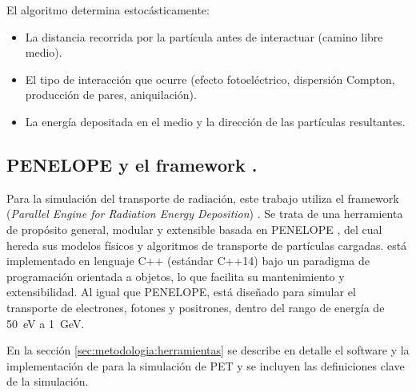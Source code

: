 
El algoritmo determina estocásticamente:
\begin{itemize}
      \item La distancia recorrida por la partícula antes de interactuar (camino libre medio).
      \item El tipo de interacción que ocurre (efecto fotoeléctrico, dispersión Compton, producción de pares, aniquilación).
      \item La energía depositada en el medio y la dirección de las partículas resultantes.
\end{itemize}


\subsection{PENELOPE y el framework \penred.}
\label{sec:estado_del_arte_fund_teoricos:penelope_penred}

Para la simulación del transporte de radiación, este trabajo utiliza el framework \penred (\emph{Parallel Engine for Radiation Energy Deposition}) \cite{Gimnez-Alventosa2021}. Se trata de una herramienta de propósito general, modular y extensible basada en PENELOPE \cite{Bar1995}, del cual hereda sus modelos físicos y algoritmos de transporte de partículas cargadas. \penred está implementado en lenguaje C++ (estándar C++14) bajo un paradigma de programación orientada a objetos, lo que facilita su mantenimiento y extensibilidad. Al igual que PENELOPE, \penred está diseñado para simular el transporte de electrones, fotones y positrones, dentro del rango de energía de \SI{50}{\electronvolt} a \SI{1}{\giga\electronvolt}.

En la sección \ref{sec:metodologia:herramientas} se describe en detalle el software y la implementación de \penred para la simulación de PET y se incluyen las definiciones clave de la simulación.

